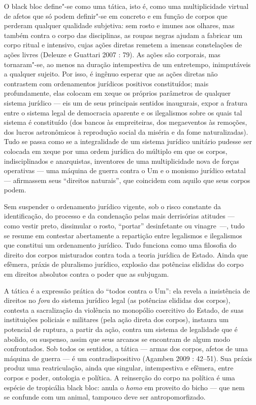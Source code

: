 O black bloc define"-se como uma tática, isto é, como uma multiplicidade
virtual de afetos que só podem definir"-se em concreto e em função de
corpos que perderam qualquer qualidade subjetiva: sem rosto e imunes aos
olhares, mas também contra o corpo das disciplinas, as roupas negras
ajudam a fabricar um corpo ritual e intensivo, cujas ações diretas
remetem a imensas constelações de ações livres (Deleuze e Guattari 2007
: 79). As ações são corporais, mas tornaram"-se, ao menos na duração
intempestiva de um entretempo, inimputáveis a qualquer sujeito. Por
isso, é ingênuo esperar que as ações diretas não contrastem com
ordenamentos jurídicos positivos constituídos; mais profundamente, elas
colocam em xeque os próprios parâmetros de qualquer sistema jurídico ---
eis um de seus principais sentidos inaugurais, expor a fratura entre o
sistema legal de democracia aparente e os ilegalismos sobre os quais tal
sistema é constituído (dos bancos às empreiteiras, dos megaeventos às
remoções, dos lucros astronômicos à reprodução social da miséria e da
fome naturalizadas). Tudo se passa como se a integralidade de um sistema
jurídico unitário pudesse ser colocada em xeque por uma ordem jurídica
do múltiplo em que os corpos, indisciplinados e anarquistas, inventores
de uma multiplicidade nova de forças operativas --- uma máquina de guerra
contra o Um e o monismo jurídico estatal --- afirmassem seus ``direitos
naturais'', que coincidem com aquilo que seus corpos podem.

Sem suspender o ordenamento jurídico vigente, sob o risco constante da
identificação, do processo e da condenação pelas mais derrisórias
atitudes --- como vestir preto, dissimular o rosto, ``portar''
desinfetante ou vinagre~---, tudo se resume em contestar abertamente a
repartição entre legalismos e ilegalismos que constitui um ordenamento
jurídico. Tudo funciona como uma filosofia do direito dos corpos
misturados contra toda a teoria jurídica de Estado. Ainda que efêmera,
práxis de pluralismo jurídico, explosão das potências elididas do corpo
em direitos absolutos contra o poder que as subjugam.

A tática é a expressão prática do ``todos contra o Um'': ela revela a
insistência de direitos no \emph{fora} do sistema jurídico legal (as
potências elididas dos corpos), contesta a sacralização da violência no
monopólio coercitivo do Estado, de suas instituições policiais e
militares (pela ação direta dos corpos), instaura um potencial de
ruptura, a partir da ação, contra um sistema de legalidade que é
abolido, ou suspenso, assim que seus arcanos se encontram de algum modo
confrontados. Sob todos os sentidos, a tática --- armas dos corpos,
afetos de uma máquina de guerra --- é um contradispositivo (Agamben 2009
: 42--51). Sua práxis produz uma reatriculação, ainda que singular,
intempestiva e efêmera, entre corpos e poder, ontologia e política. A
reinserção do corpo na política é uma espécie de tropicália black bloc:
anula o \emph{homo} em proveito do bicho --- que nem se confunde com um
animal, tampouco deve ser antropomorfizado.


